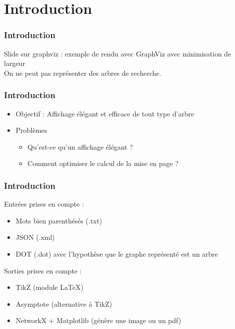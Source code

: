 \section{Introduction}

\begin{frame}
	\frametitle{Introduction}
	Slide sur graphviz : exemple de rendu avec GraphViz avec minimisation de largeur \\
	On ne peut pas représenter des arbres de recherche.
\end{frame}

\begin{frame}
	\frametitle{Introduction}
	\begin{itemize}
		\item Objectif : Affichage élégant et efficace de tout type d'arbre
		\item Problèmes \begin{itemize}
			\item Qu'est-ce qu'un affichage élégant ?
			\item Comment optimiser le calcul de la mise en page ?
		\end{itemize}
	\end{itemize}
\end{frame}

\begin{frame}
	\frametitle{Introduction}
	Entrées prises en compte :
	\begin{itemize}
		\item Mots bien parenthésés (.txt)
		\item JSON (.xml)
		\item DOT (.dot) avec l'hypothèse que le graphe représenté est un arbre
	\end{itemize}
	Sorties prises en compte :
	\begin{itemize}
		\item TikZ (module \LaTeX )
		\item Asymptote (alternative à TikZ)
		\item NetworkX + Matplotlib (génère une image ou un pdf)
	\end{itemize}
\end{frame}


